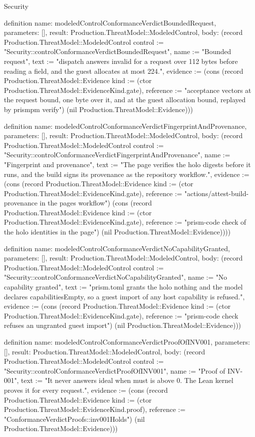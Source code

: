 \begin{lexlean}{Security}
\begin{semanticmodule}
definition{
  name: modeledControlConformanceVerdictBoundedRequest,
  parameters: [],
  result: Production.ThreatModel::ModeledControl,
  body: (record Production.ThreatModel::ModeledControl {control := "Security::controlConformanceVerdictBoundedRequest", name := "Bounded request", text := "dispatch answers invalid for a request over 112 bytes before reading a field, and the guest allocates at most 224.", evidence := (cons (record Production.ThreatModel::Evidence {kind := (ctor Production.ThreatModel::EvidenceKind.gate), reference := "acceptance vectors at the request bound, one byte over it, and at the guest allocation bound, replayed by prismpm verify"}) (nil Production.ThreatModel::Evidence))})
}

definition{
  name: modeledControlConformanceVerdictFingerprintAndProvenance,
  parameters: [],
  result: Production.ThreatModel::ModeledControl,
  body: (record Production.ThreatModel::ModeledControl {control := "Security::controlConformanceVerdictFingerprintAndProvenance", name := "Fingerprint and provenance", text := "The page verifies the holo digests before it runs, and the build signs its provenance as the repository workflow.", evidence := (cons (record Production.ThreatModel::Evidence {kind := (ctor Production.ThreatModel::EvidenceKind.gate), reference := "actions/attest-build-provenance in the pages workflow"}) (cons (record Production.ThreatModel::Evidence {kind := (ctor Production.ThreatModel::EvidenceKind.gate), reference := "prism-code check of the holo identities in the page"}) (nil Production.ThreatModel::Evidence)))})
}

definition{
  name: modeledControlConformanceVerdictNoCapabilityGranted,
  parameters: [],
  result: Production.ThreatModel::ModeledControl,
  body: (record Production.ThreatModel::ModeledControl {control := "Security::controlConformanceVerdictNoCapabilityGranted", name := "No capability granted", text := "prism.toml grants the holo nothing and the model declares capabilitiesEmpty, so a guest import of any host capability is refused.", evidence := (cons (record Production.ThreatModel::Evidence {kind := (ctor Production.ThreatModel::EvidenceKind.gate), reference := "prism-code check refuses an ungranted guest import"}) (nil Production.ThreatModel::Evidence))})
}

definition{
  name: modeledControlConformanceVerdictProofOfINV001,
  parameters: [],
  result: Production.ThreatModel::ModeledControl,
  body: (record Production.ThreatModel::ModeledControl {control := "Security::controlConformanceVerdictProofOfINV001", name := "Proof of INV-001", text := "It never answers ideal when must is above 0. The Lean kernel proves it for every request.", evidence := (cons (record Production.ThreatModel::Evidence {kind := (ctor Production.ThreatModel::EvidenceKind.proof), reference := "ConformanceVerdictProofs::inv001Holds"}) (nil Production.ThreatModel::Evidence))})
}


\end{semanticmodule}
\end{lexlean}
